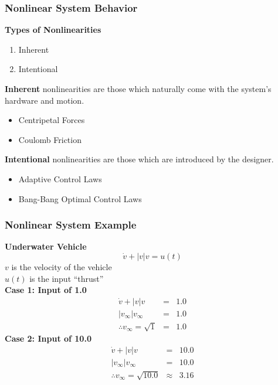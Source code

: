 \documentclass[show notes]{beamer}       %
\begin{document}
\begin{frame}
\frametitle{Nonlinear System Behavior}
\textbf{Types of Nonlinearities}
\begin{enumerate}
\item Inherent 
\item Intentional
\end{enumerate}

\textbf{Inherent} nonlinearities are those which naturally come with the system's hardware and motion.\\
\begin{itemize}
\item Centripetal Forces
\item Coulomb Friction
\end{itemize}
\textbf{Intentional} nonlinearities are those which are introduced by the designer.\\
\begin{itemize}
\item Adaptive Control Laws
\item Bang-Bang Optimal Control Laws
\end{itemize}
\end{frame}


\begin{frame}
\frametitle{Nonlinear System Example}
\textbf{Underwater Vehicle}
\begin{equation}
\dot{v} + |v|v = u(t)
\end{equation}
$v$ is the velocity of the vehicle\\
$u(t)$ is the input ``thrust''\\
\textbf{Case 1: Input of 1.0}\\
\begin{equation*}
\begin{aligned}
\dot{v} + |v|v &=& 1.0\\
|v_{\infty}|v_{\infty} &=& 1.0\\
\therefore v_{\infty} = \sqrt{1} &=& 1.0
\end{aligned}
\end{equation*}
\textbf{Case 2: Input of 10.0}\\
\begin{equation*}
\begin{aligned}
\dot{v} + |v|v &=& 10.0\\
|v_{\infty}|v_{\infty} &=& 10.0\\
\therefore v_{\infty} = \sqrt{10.0} &\approx& 3.16
\end{aligned}
\end{equation*}
\end{frame}
\end{document}
